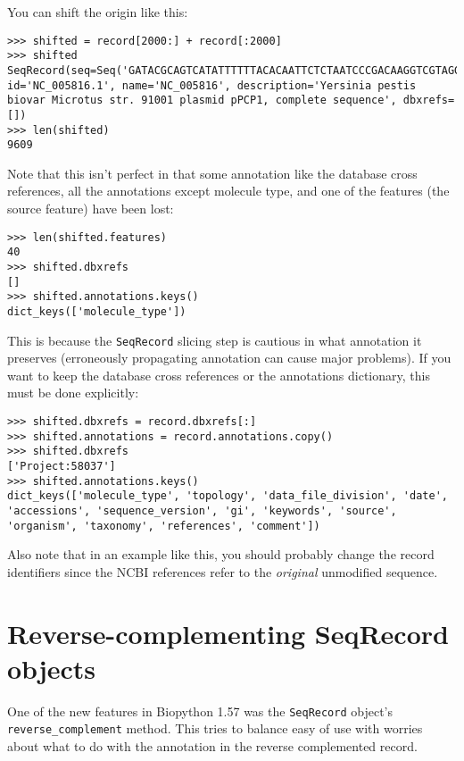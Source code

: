 You can shift the origin like this:

\begin{verbatim}
>>> shifted = record[2000:] + record[:2000]
>>> shifted
SeqRecord(seq=Seq('GATACGCAGTCATATTTTTTACACAATTCTCTAATCCCGACAAGGTCGTAGGTC...GGA'), id='NC_005816.1', name='NC_005816', description='Yersinia pestis biovar Microtus str. 91001 plasmid pPCP1, complete sequence', dbxrefs=[])
>>> len(shifted)
9609
\end{verbatim}

Note that this isn't perfect in that some annotation like the database cross
references, all the annotations except molecule type, and one of the features
(the source feature) have been lost:

\begin{verbatim}
>>> len(shifted.features)
40
>>> shifted.dbxrefs
[]
>>> shifted.annotations.keys()
dict_keys(['molecule_type'])
\end{verbatim}

This is because the \verb|SeqRecord| slicing step is cautious in what annotation
it preserves (erroneously propagating annotation can cause major problems). If
you want to keep the database cross references or the annotations dictionary,
this must be done explicitly:

\begin{verbatim}
>>> shifted.dbxrefs = record.dbxrefs[:]
>>> shifted.annotations = record.annotations.copy()
>>> shifted.dbxrefs
['Project:58037']
>>> shifted.annotations.keys()
dict_keys(['molecule_type', 'topology', 'data_file_division', 'date', 'accessions', 'sequence_version', 'gi', 'keywords', 'source', 'organism', 'taxonomy', 'references', 'comment'])
\end{verbatim}

Also note that in an example like this, you should probably change the record
identifiers since the NCBI references refer to the \emph{original} unmodified
sequence.

\section{Reverse-complementing SeqRecord objects}
\label{sec:SeqRecord-reverse-complement}

One of the new features in Biopython 1.57 was the \verb|SeqRecord| object's
\verb|reverse_complement| method. This tries to balance easy of use with worries
about what to do with the annotation in the reverse complemented record.

